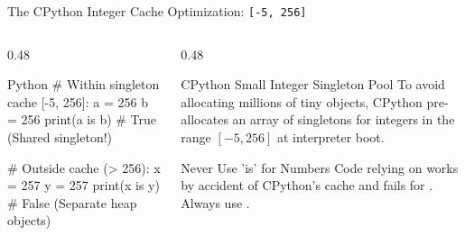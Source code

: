 \begin{frame}[fragile]{The CPython Integer Cache Optimization: \texttt{[-5, 256]}}
  \begin{columns}[T,onlytextwidth]
    \begin{column}{0.48\textwidth}
      \begin{CodeBlock}{Python}
# Within singleton cache [-5, 256]:
a = 256
b = 256
print(a is b)  # True (Shared singleton!)

# Outside cache (> 256):
x = 257
y = 257
print(x is y)  # False (Separate heap objects)
      \end{CodeBlock}
    \end{column}
    \begin{column}{0.48\textwidth}
      \begin{ConceptBox}{CPython Small Integer Singleton Pool}
        \scriptsize
        To avoid allocating millions of tiny objects, CPython pre-allocates an array of  singletons for integers in the range $[-5, 256]$ at interpreter boot.
      \end{ConceptBox}
      \vspace{0.10cm}
      \begin{WarningBox}{Never Use 'is' for Numbers}
        \scriptsize Code relying on  works by accident of CPython's cache and fails for . Always use \InlineCode{==}.
      \end{WarningBox}
    \end{column}
  \end{columns}
\end{frame}

